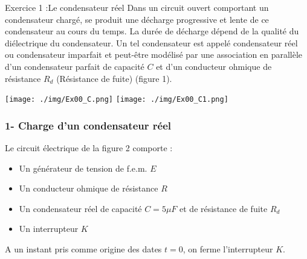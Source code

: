 \documentclass[12pt, french]{article}
\begin{document}
\begin{center}
\end{center}

\vspace{-0.2cm}



\begin{Box2}{Exercice 1 :Le condensateur réel}
	Dans un circuit ouvert comportant un condensateur chargé, se produit une décharge progressive et lente de ce condensateur au cours du temps. La durée de décharge dépend de la qualité du diélectrique du condensateur. Un tel condensateur est appelé condensateur réel ou condensateur imparfait et peut-être modélisé par une association en parallèle d'un condensateur parfait de capacité $C$ et d'un conducteur ohmique de résistance $R_d$ (Résistance de fuite) (figure 1).

	\begin{center}
		\texttt{[image: ./img/Ex00\_C.png]}
		\texttt{[image: ./img/Ex00\_C1.png]}
	\end{center}




	\subsubsection*{1- Charge d'un condensateur réel}
	Le circuit électrique de la figure 2 comporte :

	\begin{itemize}
		\item Un générateur de tension de f.e.m. $E$
		\item Un conducteur ohmique de résistance $R$
		\item Un condensateur réel de capacité $C=5\mu F$ et de résistance de fuite $R_d$
		\item Un interrupteur $K$
	\end{itemize}

	A un instant pris comme origine des dates $t=0$, on ferme l'interrupteur $K$.


\end{Box2}
\end{document}
